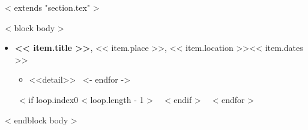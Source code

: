 ~< extends "section.tex" >~

~< block body >~
  \begin{itemize}
    ~< for item in items >~
      \item \textbf{<< item.title >>}, << item.place >>, << item.location >>\hfill << item.dates >>
      \vspace{1.2mm}
        \begin{itemize}
          ~< for detail in item.details ->~
            \item <<detail>>
            \vspace{1.2mm}
          ~<- endfor ->~
        \end{itemize}
      ~< if loop.index0 < loop.length - 1 >~
        \vspace{2.5mm}
      ~< endif >~
    ~< endfor >~
  \end{itemize}
~< endblock body >~
